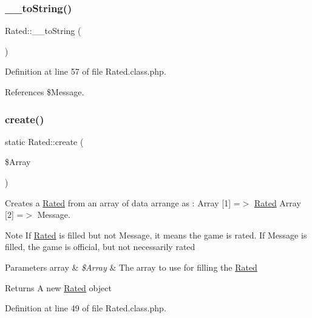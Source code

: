\subsubsection{\texorpdfstring{\+\_\+\+\_\+to\+String()}{\_\_toString()}}
{\footnotesize\ttfamily Rated\+::\+\_\+\+\_\+to\+String (\begin{DoxyParamCaption}{ }\end{DoxyParamCaption})}



Definition at line 57 of file Rated.\+class.\+php.



References \$\+Message.

\mbox{\label{class_rated_a752da492a12860ffd5dc9d9e63a252e4}} 
\subsubsection{\texorpdfstring{create()}{create()}}
{\footnotesize\ttfamily static Rated\+::create (\begin{DoxyParamCaption}\item[{}]{\$\+Array }\end{DoxyParamCaption})\hspace{0.3cm}{\ttfamily [static]}}



Creates a \hyperlink{class_rated}{Rated} from an array of data arrange as \+: Array \mbox{[}1\mbox{]} =$>$ \hyperlink{class_rated}{Rated} Array \mbox{[}2\mbox{]} =$>$ Message. 

\begin{DoxyNote}{Note}
If \hyperlink{class_rated}{Rated} is filled but not Message, it means the game is rated. If Message is filled, the game is official, but not necessarily rated 
\end{DoxyNote}

\begin{DoxyParams}[1]{Parameters}
array & {\em \$\+Array} & The array to use for filling the \hyperlink{class_rated}{Rated} \\
\hline
\end{DoxyParams}
\begin{DoxyReturn}{Returns}
A new \hyperlink{class_rated}{Rated} object 
\end{DoxyReturn}


Definition at line 49 of file Rated.\+class.\+php.



